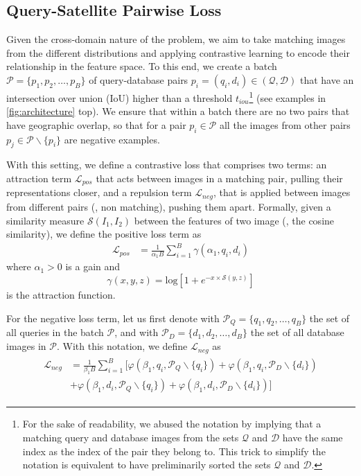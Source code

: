 \subsection{Query-Satellite Pairwise Loss}
\label{sec:query_sat_pairwise_loss}

Given the cross-domain nature of the problem, we aim to take matching images from the different distributions and applying contrastive learning to encode their relationship in the feature space.
To this end, we create a batch $\mathcal{P} = \{p_1, p_2, \ldots, p_{B} \}$ of query-database pairs $p_i = (q_i, d_i) \in (\mathcal{Q}, \mathcal{D})$ that have an intersection over union (IoU) higher than a threshold $t_{iou}$\footnote{For the sake of readability, we abused the notation by implying that a matching query and database images from the sets $\mathcal{Q}$ and $\mathcal{D}$ have the same index as the index of the pair they belong to.
This trick to simplify the notation is equivalent to have preliminarily sorted the sets $\mathcal{Q}$ and $\mathcal{D}$.} (see examples in \cref{fig:architecture} top).
We ensure that within a batch there are no two pairs that have geographic overlap, so that for a pair $p_i\in\mathcal{P}$ all the images from other pairs $p_j \in\mathcal{P}\backslash\{p_i\}$ are negative examples.

With this setting, we define a contrastive loss that comprises two terms: an attraction term $\mathcal{L}_{pos}$ that acts between images in a matching pair, pulling their representations closer, and a repulsion term $\mathcal{L}_{neg}$, that is applied between images from different pairs (\ie, non matching), pushing them apart.
Formally, given a similarity measure $\mathcal{S}(I_1, I_2)$ between the features of two image (\eg, the cosine similarity), we define the positive loss term as
{\small
\begin{align}
        \mathcal{L}_{pos} 
        & = \frac{1}{\alpha_1 B} \sum_{i=1}^{B}
      \gamma(\alpha_1, q_i, d_i)
\end{align}
}
where $\alpha_1>0$ is a gain
and
{\small
\begin{equation}
   \gamma(x,y,z) =  \text{log} \left[ 1 + e^{-x \times \mathcal{S}(y,z)} \right]
\end{equation}
}
is the attraction function.

For the negative loss term, let us first denote with $\mathcal{P}_Q  = \{q_1, q_2, \ldots, q_B\}$ the set of all queries in the batch $\mathcal{P}$, and with $\mathcal{P}_D  = \{d_1, d_2, \ldots, d_B\}$ the set of all database images in $\mathcal{P}$. With this notation, we define $\mathcal{L}_{neg}$ as 
{\small
\begin{align}    
\begin{split}
    \mathcal{L}_{neg}
    & =  \frac{1}{\beta_1 B} \sum_{i=1}^B 
    \Big[ \varphi(\beta_1, q_i, \mathcal{P}_Q\backslash\{q_i\}) + 
     \varphi(\beta_1, q_i, \mathcal{P}_D\backslash\{d_i\}) 
    \\
    &+
     \varphi(\beta_1, d_i, \mathcal{P}_Q\backslash\{q_i\})
 + 
     \varphi(\beta_1, d_i, \mathcal{P}_D\backslash\{d_i\})
    \Big]
    \end{split}
\end{align}
}

